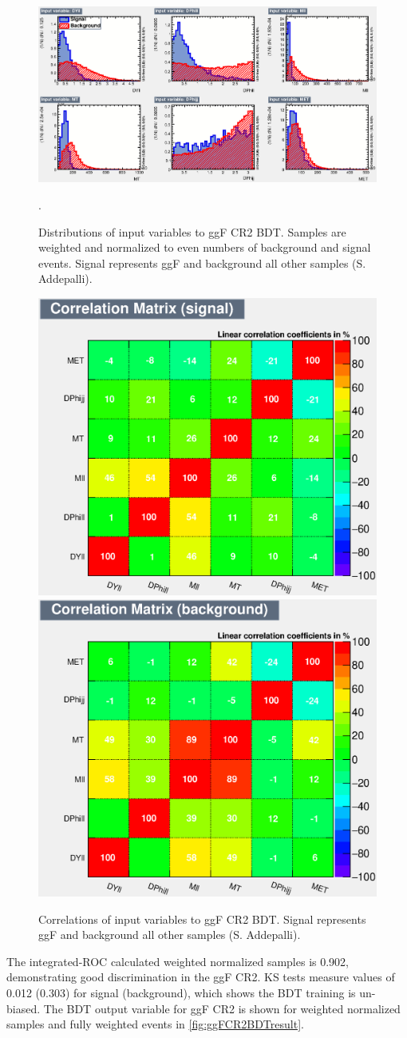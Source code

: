 \begin{figure}[!htbp]
    \centering
    \includegraphics[width=0.5\linewidth]{Pictures/ggFCR2/variables_id_c1.eps}
    \caption{Distributions of input variables to ggF CR2 BDT. Samples are weighted and normalized to even numbers of background and signal events. Signal represents ggF and background all other samples (S. Addepalli).}.
    \label{fig:ggFCR2BDTinput}
\end{figure}
\begin{figure}[!htbp]
\centering
  \includegraphics[width=.3\linewidth]{Pictures/ggFCR2/CorrelationMatrixS.eps}
  \includegraphics[width=.3\linewidth]{Pictures/ggFCR2/CorrelationMatrixB.eps}
\caption{Correlations of input variables to ggF CR2 BDT. Signal represents ggF and background all other samples (S. Addepalli).}
\label{fig:ggFCR2corrSB}
\end{figure}

The integrated-ROC calculated weighted normalized samples is 0.902, demonstrating good discrimination in the ggF CR2. KS tests measure values of 0.012 (0.303) for signal (background), which shows the BDT training is un-biased. The BDT output variable for ggF CR2 is shown for weighted normalized samples and fully weighted events in \ref{fig:ggFCR2BDTresult}. 

